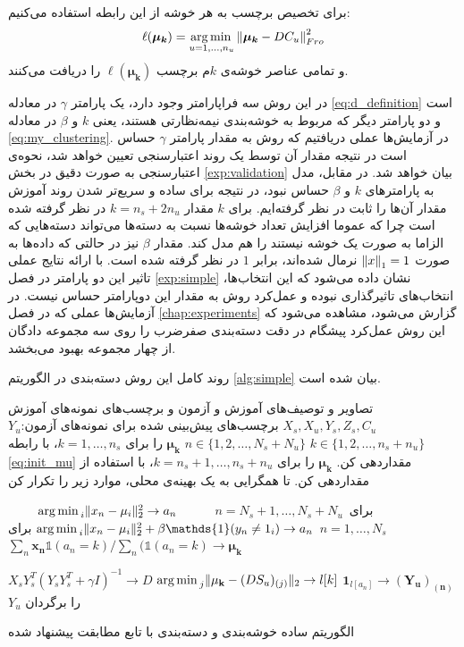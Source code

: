 برای تخصیص برچسب به هر خوشه از این رابطه استفاده می‌کنیم:
\begin{equation}
\label{eq:simple_assignment}
\ell(\boldsymbol{\mu_k}) = \operatorname*{arg\,min\,}_{u=1,\ldots,n_u} \left \lVert \boldsymbol{\mu_k} - DC_{u} \right \rVert_{Fro}^2
\end{equation}
و تمامی عناصر خوشه‌ی $k$م برچسب $\ell(\boldsymbol{\mu_k})$ را دریافت می‌کنند.

در این روش سه فراپارامتر وجود دارد، یک پارامتر $\gamma$ در معادله
\eqref{eq:d_definition}
است و دو پارامتر دیگر که مربوط به خوشه‌بندی نیمه‌نظارتی هستند، یعنی $k$ و $\beta$ در معادله
\eqref{eq:my_clustering}.
در آزمایش‌ها عملی دریافتیم که روش به مقدار پارامتر $\gamma$ حساس است در نتیجه مقدار آن توسط یک روند اعتبارسنجی تعیین خواهد شد، نحوه‌ی اعتبارسنجی به صورت دقیق در بخش
\ref{exp:validation}
بیان خواهد شد. در مقابل، مدل به پارامترهای $k$ و $\beta$ حساس نبود، در نتیجه برای ساده و سریع‌تر شدن روند آموزش مقدار آن‌ها را ثابت در نظر گرفته‌ایم. برای $k$ مقدار
$k = n_s + 2n_u$
در نظر گرفته شده است چرا که عموما افزایش تعداد خوشه‌ها نسبت به دسته‌ها می‌تواند دسته‌هایی که الزاما به صورت یک خوشه نیستند را هم مدل کند.
 مقدار $\beta$ نیز در حالتی که داده‌ها به صورت $\left \lVert x \right \rVert_1=1$ نرمال شده‌اند، برابر $1$ در نظر گرفته شده است. با ارائه نتایج عملی تاثیر این دو پارامتر در فصل
 \ref{exp:simple}
 نشان داده می‌شود که این انتخاب‌ها، انتخاب‌های تاثیرگذاری نبوده و عمل‌کرد روش به مقدار این دوپارامتر حساس نیست.
در آزمایش‌ها عملی که در فصل
\ref{chap:experiments}
گزارش می‌شود، مشاهده می‌شود که این روش  عمل‌کرد پیشگام در دقت دسته‌بندی صفرضرب را روی سه مجموعه دادگان از چهار مجموعه بهبود می‌بخشد.



روند کامل این روش دسته‌بندی در الگوریتم
\ref{alg:simple}
بیان شده است.

	\begin{enumerate}[label={\arabic*},itemsep=.1em, parsep=.1em]
 تصاویر و توصیف‌های آموزش و آزمون و برچسب‌های نمونه‌های آموزش $X_s, X_u, Y_s, Z_s, C_u$
 برچسب‌های پیش‌بینی شده برای نمونه‌های آزمون:$Y_u$
   $k \in \{ 1,2, \ldots, n_s + n_u \}$
  $n \in \{ 1,2, \ldots, N_s + N_u \}$
  $\boldsymbol{\mu_k}$ را برای  $k=1,\ldots,n_s$،  با رابطه \eqref{eq:init_mu} مقداردهی کن.
  $\boldsymbol{\mu_k}$ را برای $k=n_s+1,\ldots,n_s+n_u$، با استفاده از  مقداردهی کن.
 تا همگرایی به یک بهینه‌ی محلی، موارد زیر را تکرار کن

$\qquad$
${\operatorname*{arg\,min\,}_i \lVert x_n - \mu_i \rVert_2^2} \rightarrow a_n \, $
برای
$\, n = N_s + 1, \ldots, N_s+N_u \,$
 $\qquad$
${\argmin_i \lVert x_n - \mu_i \rVert_2^2} + \beta \mathds{1}(y_n \neq 1_i) \rightarrow a_n \, $
برای
 $n = 1, \ldots, N_s \quad$
 $\qquad$ $\sum_{n} \mathbf{x_n} \mathds{1}(a_n = k) / \sum_n (\mathds{1}(a_n = k) \rightarrow \mathbf{\mu_k}$

 $X_s Y_s^T (Y_s Y_s^T + \gamma I)^{-1} \rightarrow D$
 $\operatorname*{arg\,min\,}_j \lVert \mathbf{\mu_k} - (DS_u)_{(j)} \rVert_2 \rightarrow l[k]$
   $ \mathbf{1}_{l[a_n]} \rightarrow \mathbf{(Y_u)_{(n)}} $
 $Y_u$ را برگردان
\end{enumerate}
\caption{الگوریتم ساده خوشه‌بندی و دسته‌بندی با تابع مطابقت پیشنهاد شده}
\label{alg:simple}


